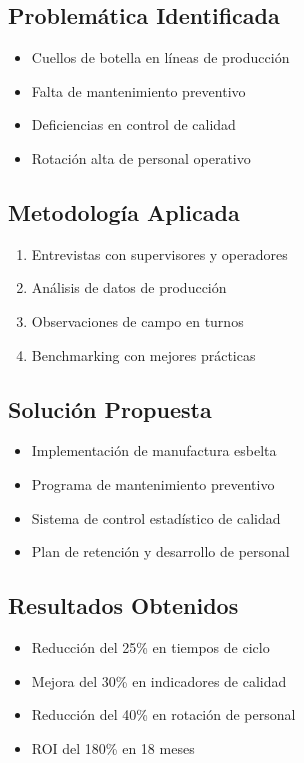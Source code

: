 \documentclass[12pt,letterpaper,oneside]{book}
\begin{document}
\subsection{Problemática Identificada}

\begin{itemize}
\item Cuellos de botella en líneas de producción
\item Falta de mantenimiento preventivo
\item Deficiencias en control de calidad
\item Rotación alta de personal operativo
\end{itemize}

\subsection{Metodología Aplicada}

\begin{enumerate}
\item Entrevistas con supervisores y operadores
\item Análisis de datos de producción
\item Observaciones de campo en turnos
\item Benchmarking con mejores prácticas
\end{enumerate}

\subsection{Solución Propuesta}

\begin{itemize}
\item Implementación de manufactura esbelta
\item Programa de mantenimiento preventivo
\item Sistema de control estadístico de calidad
\item Plan de retención y desarrollo de personal
\end{itemize}

\subsection{Resultados Obtenidos}

\begin{itemize}
\item Reducción del 25\% en tiempos de ciclo
\item Mejora del 30\% en indicadores de calidad
\item Reducción del 40\% en rotación de personal
\item ROI del 180\% en 18 meses
\end{itemize}
\end{document}
